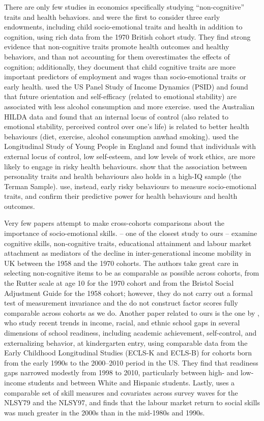 There are only few studies in economics specifically studying ``non-cognitive'' traits and health behaviors. \citet{Conti2010a} and \citet{Conti2011} were the first to consider three early endowments, including child socio-emotional traits and health in addition to cognition, using rich data from the 1970 British cohort study. They find strong evidence that non-cognitive traits promote health outcomes and healthy behaviors, and than not accounting for them overestimates the effects of cognition; additionally, they document that child cognitive traits are more important predictors of employment and wages than socio-emotional traits or early health. \citet{Chiteji2010} used the US Panel Study of Income Dynamics (PSID) and found that future orientation and self-efficacy (related to emotional stability) are associated with less alcohol consumption and more exercise. \citet{Cobb-Clark2014} used the Australian HILDA data and found that an internal locus of control (also related to emotional stability, perceived control over one's life) is related to better health behaviours (diet, exercise, alcohol consumption anwhad smoking). \citet{Mendolia2014a} used the Longitudinal Study of Young People in England and found that individuals with external locus of control, low self-esteem, and low levels of work ethics, are more likely to engage in risky health behaviours. \citet{Savelyev2017} show that the association between personality traits and health behaviours also holds in a high-IQ sample (the Terman Sample). \citet{Heckman2016a} use, instead, early risky behaviours to measure socio-emotional traits, and confirm their predictive power for health behaviours and health outcomes.

Very few papers attempt to make cross-cohorts comparisons about the importance of socio-emotional skills. \citet{Blanden2007} -- one of the closest study to ours -- examine cognitive skills, non‐cognitive traits, educational attainment and labour market attachment as mediators of the decline in inter-generational income mobility in UK between the 1958 and the 1970 cohorts. The authors take great care in selecting non-cognitive items to be as comparable as possible across cohorts, from the Rutter scale at age 10 for the 1970 cohort and from the Bristol Social Adjustment Guide for the 1958 cohort; however, they do not carry out a formal test of measurement invariance and the do not construct factor scores fully comparable across cohorts as we do. Another paper related to ours is the one by \citet{Reardon2016}, who study recent trends in income, racial, and ethnic school gaps in several dimensions of school readiness, including academic achievement, self-control, and externalizing behavior, at
kindergarten entry, using comparable data from the Early Childhood Longitudinal Studies (ECLS-K and ECLS-B) for cohorts born from the
early 1990s to the 2000–2010 period in the US. They find that readiness gaps narrowed modestly from 1998 to 2010, particularly between high- and low-income students and between White and Hispanic students. Lastly, \citet{Deming2017} uses a comparable set of skill measures and covariates across survey waves for the NLSY79 and the NLSY97, and finds that the labour market return to social skills was much greater in the 2000s than in the mid-1980s and 1990s.

